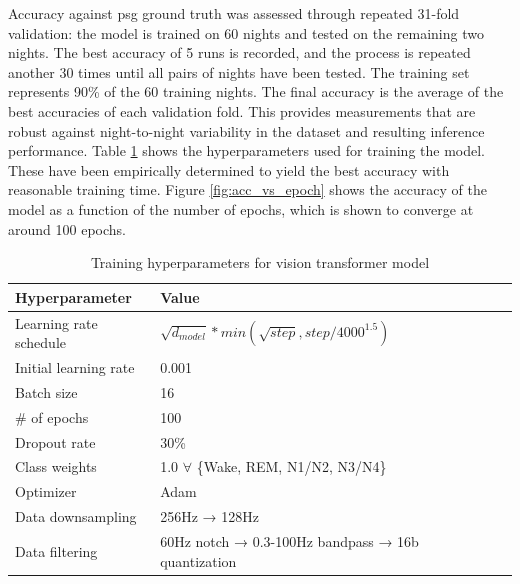 Accuracy against \ac{psg} ground truth was assessed through repeated 31-fold validation: the model is trained on 60 nights and tested on the remaining two nights. The best accuracy of 5 runs is recorded, and 
the process is repeated another 30 times until all pairs of nights have been tested. The training set represents 90\% of the 60 training nights. The final accuracy is the average of the best accuracies of each
validation fold. This provides measurements that are robust against night-to-night variability in the dataset and resulting inference performance. Table \ref{tab:training_hyperparameters} shows the
hyperparameters used for training the model. These have been empirically determined to yield the best accuracy with reasonable training time. Figure \ref{fig:acc_vs_epoch} shows the accuracy of the model as a
function of the number of epochs, which is shown to converge at around 100 epochs.

\begin{table}[ht]
    \centering
    \renewcommand{\arraystretch}{1.2} %
    \setlength{\arrayrulewidth}{1.5pt} %
    \caption{Training hyperparameters for vision transformer model}
    \begin{tabular}{@{} *5l @{}}
        Hyperparameter                  & Value &&&     \\\toprule
        Learning rate schedule          & $\sqrt{d_{model}}*min(\sqrt{step}, step/4000^{1.5})$ \\
        Initial learning rate           & 0.001        \\
        Batch size                      & 16            \\
        \# of epochs                    & 100           \\
        Dropout rate                    & 30\%          \\
        Class weights                   & 1.0 $\forall$ \{Wake, REM, N1/N2, N3/N4\} \\
        Optimizer                       & Adam          \\
        Data downsampling               & 256Hz → 128Hz \\
        Data filtering                  & 60Hz notch → 0.3-100Hz bandpass → 16b quantization \\            
        \hline
    \end{tabular}
    \label{tab:training_hyperparameters}
\end{table}

